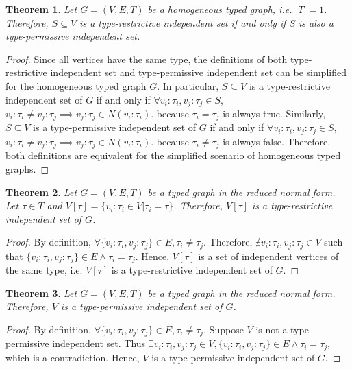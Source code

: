 \documentclass[preprint,12pt]{elsarticle}
\theoremstyle{plain}
\newtheorem{theorem}{Theorem}[section]
\newcommand\tyv[2]{#1\!\!:\!\!#2}
\begin{document}
\begin{theorem}
Let $G = (V,E,T)$ be a homogeneous typed graph, i.e. $|T|=1$.
Therefore, $S\subseteq V$ is a type-restrictive independent set
if and only if $S$ is also a type-permissive independent set.
\end{theorem}
\begin{proof}
Since all vertices have the same type,
the definitions of both type-restrictive independent set
and type-permissive independent set can be simplified
for the homogeneous typed graph $G$.
In particular,
$S\subseteq V$ is a type-restrictive independent set of $G$
if and only if
$\forall \tyv{v_i}{\tau_i},\tyv{v_j}{\tau_j}\in S$,
$\tyv{v_i}{\tau_i}\neq\tyv{v_j}{\tau_j} \implies \tyv{v_j}{\tau_j}\in N(\tyv{v_i}{\tau_i})$.
because
$\tau_i=\tau_j$
is always true.
Similarly,
$S\subseteq V$ is a type-permissive independent set of $G$
if and only if
$\forall \tyv{v_i}{\tau_i},\tyv{v_j}{\tau_j}\in S$,
$\tyv{v_i}{\tau_i}\neq\tyv{v_j}{\tau_j} \implies \tyv{v_j}{\tau_j}\in N(\tyv{v_i}{\tau_i})$.
because
$\tau_i\neq\tau_j$ is always false.
Therefore, both definitions are equivalent for the simplified 
scenario of homogeneous typed graphs.
\end{proof}

\begin{theorem}
Let $G = (V,E,T)$ be a typed graph in the reduced normal form.
Let $\tau \in T$ and
$V[\tau] = \{\tyv{v_i}{\tau_i}\in V | \tau_i=\tau\}$.
Therefore, $V[\tau]$ is a type-restrictive independent set of $G$.
\end{theorem}
\begin{proof}
By definition, $\forall \{\tyv{v_i}{\tau_i},\tyv{v_j}{\tau_j}\}\in E, \tau_i\neq\tau_j$.
Therefore, $\nexists \tyv{v_i}{\tau_i},\tyv{v_j}{\tau_j} \in V$
such that $\{\tyv{v_i}{\tau_i},\tyv{v_j}{\tau_j}\}\in E \wedge \tau_i=\tau_j$.
Hence, $V[\tau]$ is a set of independent vertices of the same type,
i.e. $V[\tau]$ is a type-restrictive independent set of $G$.
\end{proof}

\begin{theorem}
Let $G = (V,E,T)$ be a typed graph in the reduced normal form.
Therefore, $V$ is a type-permissive independent set of $G$.
\end{theorem}
\begin{proof}
By definition, $\forall \{\tyv{v_i}{\tau_i},\tyv{v_j}{\tau_j}\}\in E, \tau_i\neq\tau_j$.
Suppose $V$ is not a type-permissive independent set.
Thus
$\exists \tyv{v_i}{\tau_i},\tyv{v_j}{\tau_j}\in V,
 \{\tyv{v_i}{\tau_i},\tyv{v_j}{\tau_j}\}\in E \wedge \tau_i=\tau_j$,
which is a contradiction.
Hence, $V$ is a type-permissive independent set of $G$.
\end{proof}
\end{document}
